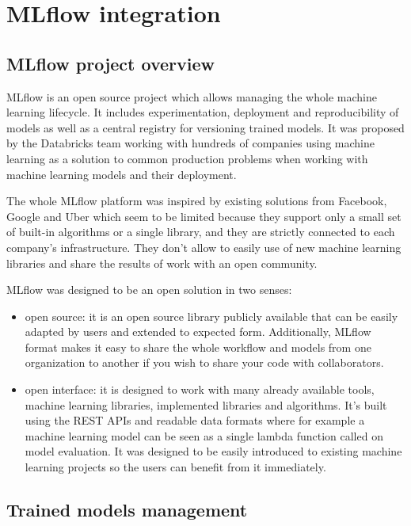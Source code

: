 \chapter{MLflow integration}
\label{chap:mlflow}

\section{MLflow project overview}

MLflow is an open source project which allows managing the whole machine learning lifecycle.
It includes experimentation, deployment and reproducibility of models as well as a central registry
for versioning trained models. It was proposed by the Databricks team working with hundreds of companies
using machine learning as a solution to common production problems when working with machine learning
models and their deployment.\cite{mlflowpage}

The whole MLflow platform was inspired by existing solutions from Facebook, Google and Uber which
seem to be limited because they support only a small set of built-in algorithms or a single library,
and they are strictly connected to each company’s infrastructure. They don’t allow to easily use of new
machine learning libraries and share the results of work with an open community.\cite{mlflowarticle}

MLflow was designed to be an open solution in two senses:

\begin{itemize}
	\item open source: it is an open source library publicly available that can be easily adapted
	by users and extended to expected form. Additionally, MLflow format makes it easy to share
	the whole workflow and models from one organization to another if you wish to share your
	code with collaborators.

	\item open interface: it is designed to work with many already available tools, machine learning
	libraries, implemented libraries and algorithms. It’s built using the REST APIs and readable data
	formats where for example a machine learning model can be seen as a single lambda function called
	on model evaluation. It was designed to be easily introduced to existing machine learning projects
	so the users can benefit from it immediately.
\end{itemize}

\section{Trained models management}

